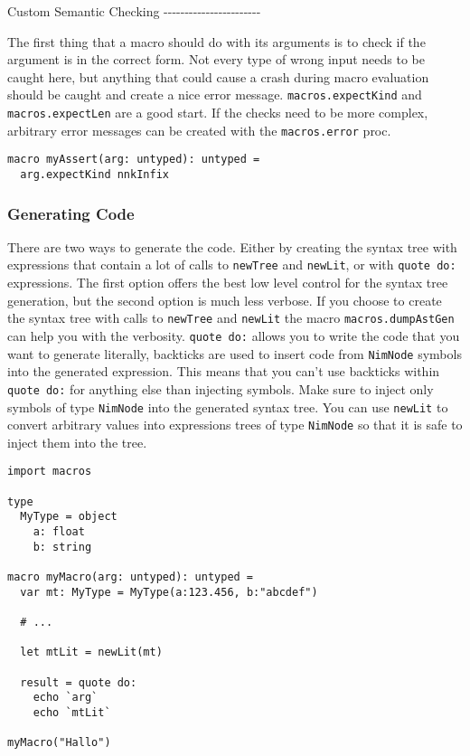 Custom Semantic Checking
-\/-\/-\/-\/-\/-\/-\/-\/-\/-\/-\/-\/-\/-\/-\/-\/-\/-\/-\/-\/-\/-\/-

The first thing that a macro should do with its arguments is to check if
the argument is in the correct form. Not every type of wrong input needs
to be caught here, but anything that could cause a crash during macro
evaluation should be caught and create a nice error message.
\texttt{macros.expectKind} and \texttt{macros.expectLen} are a good
start. If the checks need to be more complex, arbitrary error messages
can be created with the \texttt{macros.error} proc.

\begin{verbatim}
macro myAssert(arg: untyped): untyped =
  arg.expectKind nnkInfix
\end{verbatim}

\hypertarget{generating-code}{%
\subsubsection{Generating Code}\label{generating-code}}

There are two ways to generate the code. Either by creating the syntax
tree with expressions that contain a lot of calls to \texttt{newTree}
and \texttt{newLit}, or with \texttt{quote\ do:} expressions. The first
option offers the best low level control for the syntax tree generation,
but the second option is much less verbose. If you choose to create the
syntax tree with calls to \texttt{newTree} and \texttt{newLit} the macro
\texttt{macros.dumpAstGen} can help you with the verbosity.
\texttt{quote\ do:} allows you to write the code that you want to
generate literally, backticks are used to insert code from
\texttt{NimNode} symbols into the generated expression. This means that
you can't use backticks within \texttt{quote\ do:} for anything else
than injecting symbols. Make sure to inject only symbols of type
\texttt{NimNode} into the generated syntax tree. You can use
\texttt{newLit} to convert arbitrary values into expressions trees of
type \texttt{NimNode} so that it is safe to inject them into the tree.

\begin{verbatim}
import macros

type
  MyType = object
    a: float
    b: string

macro myMacro(arg: untyped): untyped =
  var mt: MyType = MyType(a:123.456, b:"abcdef")

  # ...

  let mtLit = newLit(mt)

  result = quote do:
    echo `arg`
    echo `mtLit`

myMacro("Hallo")
\end{verbatim}

